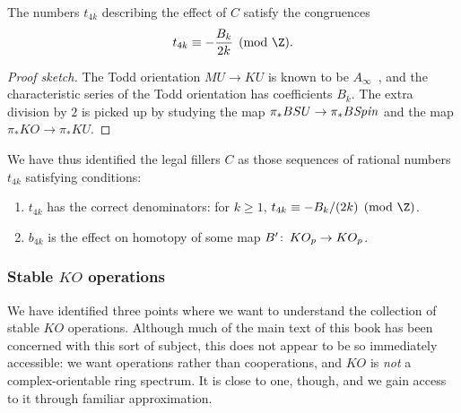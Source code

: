 \begin{corollary}
The numbers $t_{4k}$ describing the effect of $C$ satisfy the congruences \[t_{4k} \equiv -\frac{B_k}{2k} \pmod{\Z}.\]
\end{corollary}
\begin{proof}[Proof sketch]
The Todd orientation $MU \to KU$ is known to be $A_\infty$~\cite[Theorem V.4.1]{EKMM}, and the characteristic series of the Todd orientation has coefficients $B_k$.  The extra division by $2$ is picked up by studying the map $\pi_* BSU \to \pi_* B\mathit{Spin}$ and the map $\pi_* KO \to \pi_* KU$.
\end{proof}

We have thus identified the legal fillers $C$ as those sequences of rational numbers $t_{4k}$ satisfying conditions:
\begin{enumerate}
    \item $t_{4k}$ has the correct denominators: for $k \ge 1$, $t_{4k} \equiv -B_k/(2k) \pmod{\Z}$.
    \item $b_{4k}$ is the effect on homotopy of some map $B'\colon\thinspace KO_p \to KO_p$.
\end{enumerate}


\subsubsection{Stable $KO$ operations}
\newcommand{\cts}{\mathrm{cts}}

We have identified three points where we want to understand the collection of stable $KO$ operations.  Although much of the main text of this book has been concerned with this sort of subject, this does not appear to be so immediately accessible: we want operations rather than cooperations, and $KO$ is \emph{not} a complex-orientable ring spectrum.  It is close to one, though, and we gain access to it through familiar approximation.

